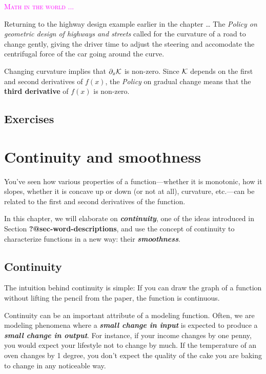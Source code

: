 \documentclass[
  letterpaper,
  DIV=11,
  numbers=noendperiod,
  oneside]{scrreprt}
\newenvironment{intheworld}%
{%
\textcolor{magenta}{\hrulefill}%
  \par\vspace{.3\baselineskip}%
  \textcolor{magenta}{\scshape Math in the world ...}%
  \par\vspace{\baselineskip}%
}%
{\textcolor{magenta}{\hrulefill}}
\begin{document}
\begin{intheworld}
Returning to the highway design example earlier in the chapter \ldots{}
The \emph{Policy on geometric design of highways and streets} called for
the curvature of a road to change gently, giving the driver time to
adjust the steering and accomodate the centrifugal force of the car
going around the curve.

Changing curvature implies that \(\partial_x {\cal K}\) is non-zero.
Since \({\cal K}\) depends on the first and second derivatives of
\(f(x)\), the \emph{Policy} on gradual change means that the
\textbf{third derivative} of \(f(x)\) is non-zero.

\end{intheworld}

\hypertarget{exercises-4}{%
\section{Exercises}\label{exercises-4}}

\hypertarget{sec-cont-and-smooth}{%
\chapter{Continuity and smoothness}\label{sec-cont-and-smooth}}

You've seen how various properties of a function---whether it is
monotonic, how it slopes, whether it is concave up or down (or not at
all), curvature, etc.---can be related to the first and second
derivatives of the function.

In this chapter, we will elaborate on \textbf{\emph{continuity}}, one of
the ideas introduced in Section \textbf{?@sec-word-descriptions}, and
use the concept of continuity to characterize functions in a new way:
their \textbf{\emph{smoothness}}.

\hypertarget{continuity}{%
\section{Continuity}\label{continuity}}

The intuition behind continuity is simple: If you can draw the graph of
a function without lifting the pencil from the paper, the function is
continuous.

Continuity can be an important attribute of a modeling function. Often,
we are modeling phenomena where a \textbf{\emph{small change in input}}
is expected to produce a \textbf{\emph{small change in output}}. For
instance, if your income changes by one penny, you would expect your
lifestyle not to change by much. If the temperature of an oven changes
by 1 degree, you don't expect the quality of the cake you are baking to
change in any noticeable way.
\end{document}
